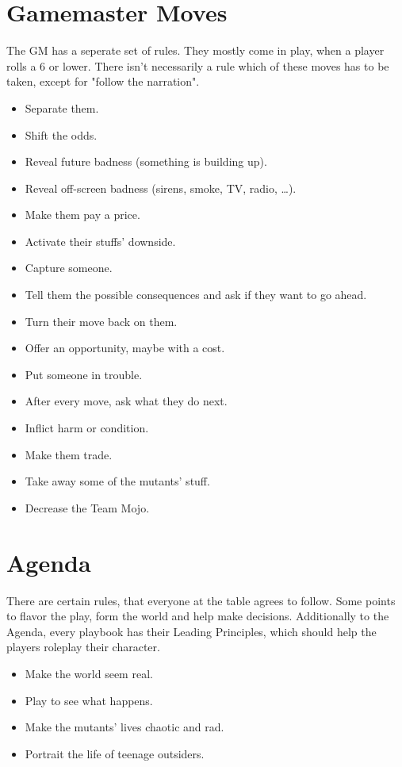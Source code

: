 \documentclass{book}
\begin{document}
\section*{Gamemaster Moves \label{sec:GMmoves}}
The GM has a seperate set of rules. They mostly come in play, when a player rolls a 6 or lower. There isn't necessarily a rule which of these moves has to be taken, except for "follow the narration".
\begin{itemize}
    \item Separate them.
    \item Shift the odds.
    \item Reveal future badness (something is building up).
    \item Reveal off-screen badness (sirens, smoke, TV, radio, …).
    \item Make them pay a price.
    \item Activate their stuffs' downside.
    \item Capture someone.
    \item Tell them the possible consequences and ask if they want to go ahead.
    \item Turn their move back on them.
    \item Offer an opportunity, maybe with a cost.
    \item Put someone in trouble.
    \item After every move, ask what they do next.
    \item Inflict harm or condition.
    \item Make them trade.
    \item Take away some of the mutants' stuff.
    \item Decrease the Team Mojo.
\end{itemize}

\section*{Agenda}
There are certain rules, that everyone at the table agrees to follow. Some points to flavor the play, form the world and help make decisions. Additionally to the Agenda, every playbook has their Leading Principles, which should help the players roleplay their character.
\begin{itemize}
    \item Make the world seem real.
    \item Play to see what happens.
    \item Make the mutants' lives chaotic and rad.
    \item Portrait the life of teenage outsiders.
\end{itemize}
\end{document}
